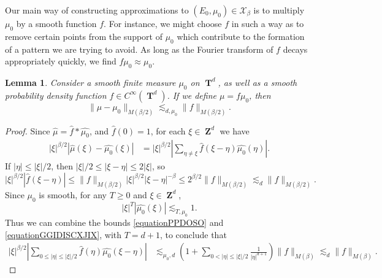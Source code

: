 \documentclass[12pt,reqno]{article}
\numberwithin{equation}{section}
\DeclareMathOperator{\ZZ}{\mathbf{Z}}
\DeclareMathOperator{\TT}{\mathbf{T}}
\newtheorem{lemma}[theorem]{Lemma}
\numberwithin{theorem}{section}
\begin{document}
Our main way of constructing approximations to $(E_0,\mu_0) \in \mathcal{X}_\beta$ is to multiply $\mu_0$ by a smooth function $f$. For instance, we might choose $f$ in such a way as to remove certain points from the support of $\mu_0$ which contribute to the formation of a pattern we are trying to avoid. As long as the Fourier transform of $f$ decays appropriately quickly, we find $f \mu_0 \approx \mu_0$.

\begin{lemma} \label{LemmaTTSICICS}
    Consider a smooth finite measure $\mu_0$ on $\TT^d$, as well as a smooth probability density function $f \in C^\infty(\TT^d)$. If we define $\mu = f \mu_0$, then
    \[ \| \mu - \mu_0 \|_{M(\beta/2)} \lesssim_{d,\mu_0} \| f \|_{M(\beta/2)}. \]
\end{lemma}
\begin{proof}
    Since $\widehat{\mu} = \widehat{f} * \widehat{\mu_0}$, and $\widehat{f}(0) = 1$, for each $\xi \in \ZZ^d$ we have
    \begin{equation} \label{equationPPYTUECUUCS}
    \begin{split}
        |\xi|^{\beta/2} |\widehat{\mu}(\xi) - \widehat{\mu_0}(\xi)| &= |\xi|^{\beta/2} \left| \sum_{\eta \neq \xi} \widehat{f}(\xi - \eta) \widehat{\mu_0}(\eta) \right|.
    \end{split}
    \end{equation}
    If $|\eta| \leq |\xi|/2$, then $|\xi|/2 \leq |\xi - \eta| \leq 2 |\xi|$, so
    \begin{equation} \label{equationPPDOSO}
        |\xi|^{\beta/2} |\widehat{f}(\xi - \eta)| \leq \| f \|_{M(\beta/2)} |\xi|^{\beta/2} |\xi-\eta|^{-\beta} \leq 2^{\beta/2} \| f \|_{M(\beta/2)} \lesssim_d \| f \|_{M(\beta/2)}.
    \end{equation}
    Since $\mu_0$ is smooth, for any $T \geq 0$ and $\xi \in \ZZ^d$,
    \begin{equation} \label{equationGGIDISCXJIX}
        |\xi|^T |\widehat{\mu_0}(\xi)| \lesssim_{T,\mu_0} 1.
    \end{equation}
    Thus we can combine the bounds \eqref{equationPPDOSO} and \eqref{equationGGIDISCXJIX}, with $T = d+1$, to conclude that
    \begin{equation} \label{equationGGPSOVVCSI}
    \begin{split}
        |\xi|^{\beta/2} \left| \sum_{0 \leq |\eta| \leq |\xi|/2} \widehat{f}(\eta) \widehat{\mu_0}(\xi - \eta) \right| &\lesssim_{\mu_0,d} \left( 1 + \sum_{0 < |\eta| \leq |\xi|/2} \frac{1}{|\eta|^{d+1}} \right) \| f \|_{M(\beta)} \lesssim_d \| f \|_{M(\beta)}.

\end{split}
\end{equation}
\end{proof}
\end{document}
